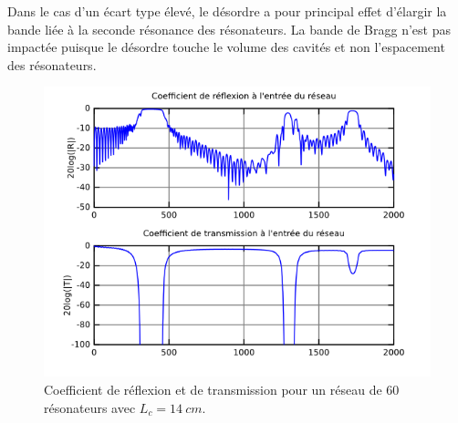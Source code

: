 Dans le cas d'un écart type élevé, le désordre a pour principal effet d'élargir la bande liée à la seconde résonance des résonateurs. La bande de Bragg n'est pas impactée puisque le désordre touche le volume des cavités et non l'espacement des résonateurs. 

\begin{figure}
	\centering
	\includegraphics[scale=1]{./images_chp1/chaos_2mm.png}
	\caption{\label{chaos2} Coefficient de réflexion et de transmission pour un réseau de 60 résonateurs avec $L_c=14~cm$.}
\end{figure}



